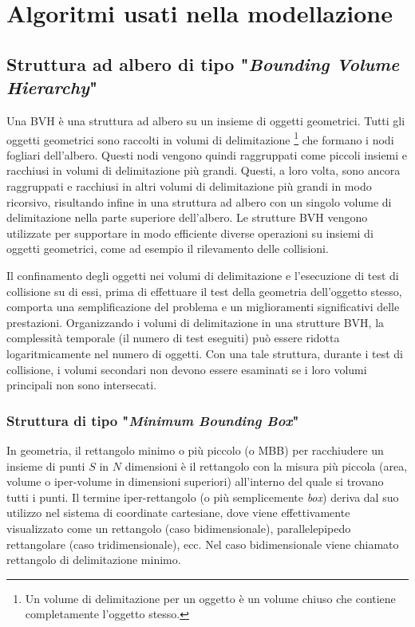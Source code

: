 \chapter{Algoritmi usati nella modellazione}
\label{Geom_Algos}
%
\section{Struttura ad albero di tipo "\textit{Bounding Volume Hierarchy}"}
%
Una \ac{BVH} è una struttura ad albero su un insieme di oggetti geometrici. Tutti gli oggetti geometrici sono raccolti in volumi di delimitazione \footnote{ Un volume di delimitazione per un oggetto è un volume chiuso che contiene completamente l'oggetto stesso.} che formano i nodi fogliari dell'albero. Questi nodi vengono quindi raggruppati come piccoli insiemi e racchiusi in volumi di delimitazione più grandi. Questi, a loro volta, sono ancora raggruppati e racchiusi in altri volumi di delimitazione più grandi in modo ricorsivo, risultando infine in una struttura ad albero con un singolo volume di delimitazione nella parte superiore dell'albero. Le strutture \ac{BVH} vengono utilizzate per supportare in modo efficiente diverse operazioni su insiemi di oggetti geometrici, come ad esempio il rilevamento delle collisioni.

Il confinamento degli oggetti nei volumi di delimitazione e l'esecuzione di test di collisione su di essi, prima di effettuare il test della geometria dell'oggetto stesso, comporta una semplificazione del problema e un miglioramenti significativi delle prestazioni. Organizzando i volumi di delimitazione in una strutture \ac{BVH}, la complessità temporale (il numero di test eseguiti) può essere ridotta logaritmicamente nel numero di oggetti. Con una tale struttura, durante i test di collisione, i volumi secondari non devono essere esaminati se i loro volumi principali non sono intersecati.
%
\subsection{Struttura di tipo "\textit{Minimum Bounding Box}"}
In geometria, il rettangolo minimo o più piccolo (o \ac{MBB}) per racchiudere un insieme di punti $S$ in $N$ dimensioni è il rettangolo con la misura più piccola (area, volume o iper-volume in dimensioni superiori) all'interno del quale si trovano tutti i punti.  Il termine iper-rettangolo (o più semplicemente \textit{box}) deriva dal suo utilizzo nel sistema di coordinate cartesiane, dove viene effettivamente visualizzato come un rettangolo (caso bidimensionale), parallelepipedo rettangolare (caso tridimensionale), ecc. Nel caso bidimensionale viene chiamato rettangolo di delimitazione minimo.
%
